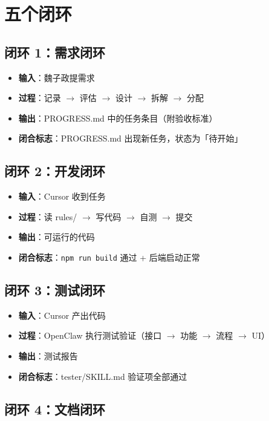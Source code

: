 \documentclass[11pt,a4paper]{article}
\begin{document}
\section{五个闭环}

\subsection{闭环 1：需求闭环}

\begin{itemize}[nosep]
  \item \textbf{输入}：魏子政提需求
  \item \textbf{过程}：记录 $\to$ 评估 $\to$ 设计 $\to$ 拆解 $\to$ 分配
  \item \textbf{输出}：PROGRESS.md 中的任务条目（附验收标准）
  \item \textbf{闭合标志}：PROGRESS.md 出现新任务，状态为「待开始」
\end{itemize}

\subsection{闭环 2：开发闭环}

\begin{itemize}[nosep]
  \item \textbf{输入}：Cursor 收到任务
  \item \textbf{过程}：读 rules/ $\to$ 写代码 $\to$ 自测 $\to$ 提交
  \item \textbf{输出}：可运行的代码
  \item \textbf{闭合标志}：\texttt{npm run build} 通过 + 后端启动正常
\end{itemize}

\subsection{闭环 3：测试闭环}

\begin{itemize}[nosep]
  \item \textbf{输入}：Cursor 产出代码
  \item \textbf{过程}：OpenClaw 执行测试验证（接口 $\to$ 功能 $\to$ 流程 $\to$ UI）
  \item \textbf{输出}：测试报告
  \item \textbf{闭合标志}：tester/SKILL.md 验证项全部通过
\end{itemize}

\subsection{闭环 4：文档闭环}
\end{document}
